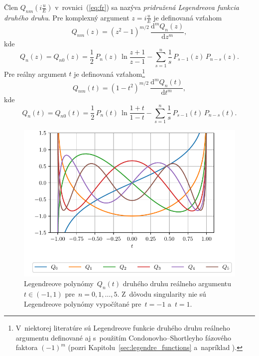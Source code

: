 \documentclass[a4paper, 12pt]{book}
\newcommand{\diff}{\mathrm d}
\begin{document}
Člen $Q_{nm}\left( i \frac{u}{E} \right)$ v~rovnici~(\ref{eq:fr}) sa nazýva 
\emph{pridružená Legendreova funkcia druhého druhu}.  Pre komplexný argument $z 
= i \frac{u}{E}$ je definovaná vzťahom \parencite{MoritzTheFigureOfTheEarth}
%
\begin{equation}
\label{eq:qnm_imag_def}
Q_{nm}(z) = (z^2 - 1)^{m \slash 2} \, \frac{\diff^m Q_n(z)}{\diff z^m}{,}
\end{equation}
%
kde
%
\begin{equation}
\label{eq:qn0_imag_def}
Q_{n}(z) = Q_{n0}(z) = \frac{1}{2} \, P_n(z) \, \ln\frac{z + 1}{z - 1} 
- \sum_{s = 1}^n \frac{1}{s} \, P_{s - 1}(z) \, P_{n - s}(z){.}
\end{equation}
%
Pre reálny argument $t$ je definovaná vzťahom\footnote{V~niektorej literatúre 
sú Legendreove funkcie druhého druhu reálneho argumentu definované aj 
s~použitím Condonovho--Shortleyho fázového faktora $(-1)^m$ (pozri 
Kapitolu~\ref{sec:legendre_functions} a~napríklad \cite{Olver2010}).}
\parencite{MoritzPhysicalGeodesy}
%
\begin{equation}
\label{eq:qnm_real_def}
Q_{nm}(t) = (1 - t^2)^{m \slash 2} \, \frac{\diff^m Q_n(t)}{\diff t^m}{,}
\end{equation}
%
kde
%
\begin{equation}
\label{eq:qn0_real_def}
Q_{n}(t) = Q_{n0}(t) = \frac{1}{2} \, P_n(t) \, \ln\frac{1 + t}{1 - t} 
- \sum_{s = 1}^n \frac{1}{s} \, P_{s - 1}(t) \, P_{n - s}(t){.}
\end{equation}

\begin{figure}
\centering
\includegraphics{./fig-legendre-polynomials-qn.pdf}
\caption{Legendreove polynómy~$Q_n(t)$ druhého druhu reálneho argumentu $t \in 
(-1, 1)$ pre~$n = 0, 1, \dots, 5$.  Z~dôvodu singularity nie sú Legendreove 
polynómy vypočítané pre~$t = -1$ a~$t = 1$.}
\label{fig:lp_2nd}
\end{figure}
\end{document}
